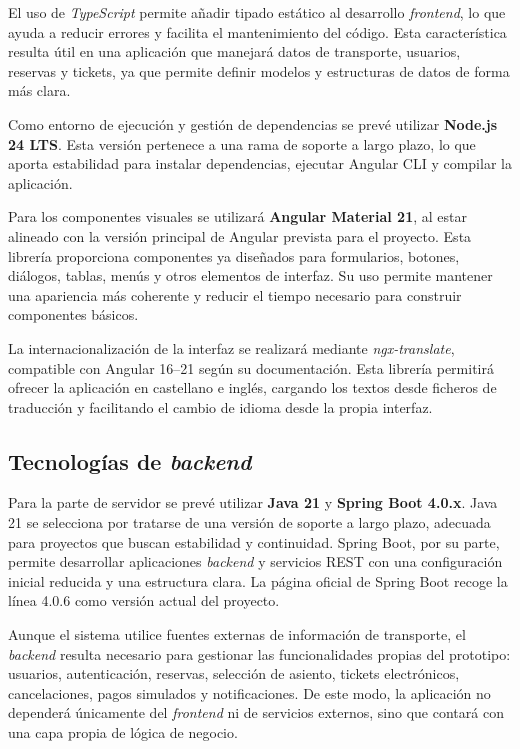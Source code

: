 El uso de \textit{TypeScript} permite añadir tipado estático al desarrollo \textit{frontend}, lo que ayuda a reducir errores y facilita el mantenimiento del código. Esta característica resulta útil en una aplicación que manejará datos de transporte, usuarios, reservas y tickets, ya que permite definir modelos y estructuras de datos de forma más clara.

Como entorno de ejecución y gestión de dependencias se prevé utilizar \textbf{Node.js 24 LTS}. Esta versión pertenece a una rama de soporte a largo plazo, lo que aporta estabilidad para instalar dependencias, ejecutar Angular CLI y compilar la aplicación.

Para los componentes visuales se utilizará \textbf{Angular Material 21}, al estar alineado con la versión principal de Angular prevista para el proyecto. Esta librería proporciona componentes ya diseñados para formularios, botones, diálogos, tablas, menús y otros elementos de interfaz. Su uso permite mantener una apariencia más coherente y reducir el tiempo necesario para construir componentes básicos.

La internacionalización de la interfaz se realizará mediante \textit{ngx-translate}, compatible con Angular 16--21 según su documentación. Esta librería permitirá ofrecer la aplicación en castellano e inglés, cargando los textos desde ficheros de traducción y facilitando el cambio de idioma desde la propia interfaz.

\subsection{Tecnologías de \textit{backend}}

Para la parte de servidor se prevé utilizar \textbf{Java 21} y \textbf{Spring Boot 4.0.x}. Java 21 se selecciona por tratarse de una versión de soporte a largo plazo, adecuada para proyectos que buscan estabilidad y continuidad. Spring Boot, por su parte, permite desarrollar aplicaciones \textit{backend} y servicios REST con una configuración inicial reducida y una estructura clara. La página oficial de Spring Boot recoge la línea 4.0.6 como versión actual del proyecto.

Aunque el sistema utilice fuentes externas de información de transporte, el \textit{backend} resulta necesario para gestionar las funcionalidades propias del prototipo: usuarios, autenticación, reservas, selección de asiento, tickets electrónicos, cancelaciones, pagos simulados y notificaciones. De este modo, la aplicación no dependerá únicamente del \textit{frontend} ni de servicios externos, sino que contará con una capa propia de lógica de negocio.

